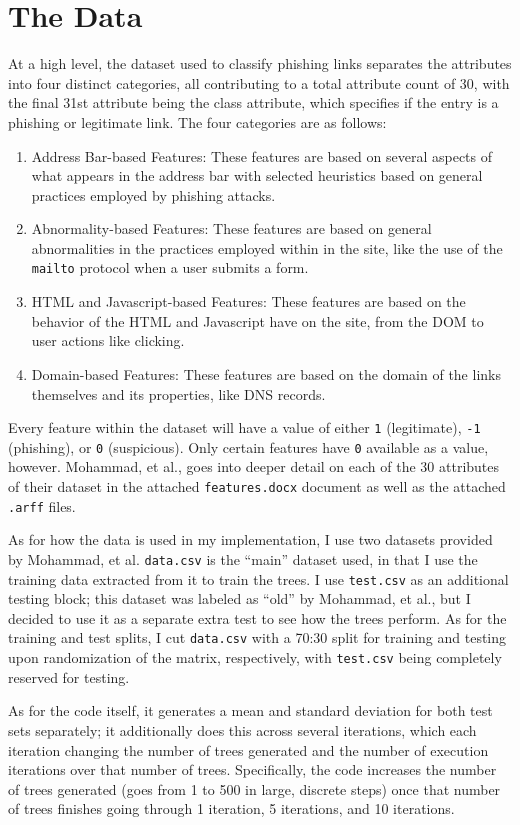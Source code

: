 \documentclass[12pt]{article}
\begin{document}
  \section{The Data}
  At a high level, the dataset used to classify phishing links separates the attributes into four distinct categories, all contributing to a total attribute count of 30, with the final 31st attribute being the class attribute, which specifies if the entry is a phishing or legitimate link. The four categories are as follows:
  \begin{enumerate}
    \item Address Bar-based Features: These features are based on several aspects of what appears in the address bar with selected heuristics based on general practices employed by phishing attacks.
    \item Abnormality-based Features: These features are based on general abnormalities in the practices employed within in the site, like the use of the \verb|mailto| protocol when a user submits a form.
    \item HTML and Javascript-based Features: These features are based on the behavior of the HTML and Javascript have on the site, from the DOM to user actions like clicking.
    \item Domain-based Features: These features are based on the domain of the links themselves and its properties, like DNS records.
  \end{enumerate}
  Every feature within the dataset will have a value of either \verb|1| (legitimate), \verb|-1| (phishing), or \verb|0| (suspicious). Only certain features have \verb|0| available as a value, however. Mohammad, et al., goes into deeper detail on each of the 30 attributes of their dataset in the attached \verb|features.docx| document as well as the attached \verb|.arff| files.

  As for how the data is used in my implementation, I use two datasets provided by Mohammad, et al. \verb|data.csv| is the ``main'' dataset used, in that I use the training data extracted from it to train the trees. I use \verb|test.csv| as an additional testing block; this dataset was labeled as ``old'' by Mohammad, et al., but I decided to use it as a separate extra test to see how the trees perform. As for the training and test splits, I cut \verb|data.csv| with a 70:30 split for training and testing upon randomization of the matrix, respectively, with \verb|test.csv| being completely reserved for testing.
  
  As for the code itself, it generates a mean and standard deviation for both test sets separately; it additionally does this across several iterations, which each iteration changing the number of trees generated and the number of execution iterations over that number of trees. Specifically, the code increases the number of trees generated (goes from 1 to 500 in large, discrete steps) once that number of trees finishes going through 1 iteration, 5 iterations, and 10 iterations.
  
\end{document}
